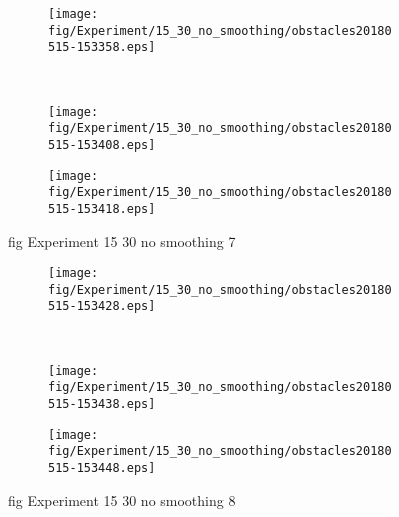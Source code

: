 \begin{figure}[H]
	\centering
	\begin{subfigure}[b]{0.45\textwidth}
		\texttt{[image: fig/Experiment/15\_30\_no\_smoothing/obstacles20180515-153358.eps]}
		\caption{}
		\label{fig:Experiment:15_30_no_smoothing:obstacles20180515-153358}
	\end{subfigure}
	~
	\begin{subfigure}[b]{0.45\textwidth}
		\texttt{[image: fig/Experiment/15\_30\_no\_smoothing/obstacles20180515-153408.eps]}
		\caption{}
		\label{fig:Experiment:15_30_no_smoothing:obstacles20180515-153408}
	\end{subfigure}

	\begin{subfigure}[b]{0.45\textwidth}
		\texttt{[image: fig/Experiment/15\_30\_no\_smoothing/obstacles20180515-153418.eps]}
		\caption{}
		\label{fig:Experiment:15_30_no_smoothing:obstacles20180515-153418}
	\end{subfigure}
	\caption{fig Experiment 15 30 no smoothing 7}
	\label{fig:Experiment:15_30_no_smoothing:7}
\end{figure}

\begin{figure}[H]
	\centering
	\begin{subfigure}[b]{0.45\textwidth}
		\texttt{[image: fig/Experiment/15\_30\_no\_smoothing/obstacles20180515-153428.eps]}
		\caption{}
		\label{fig:Experiment:15_30_no_smoothing:obstacles20180515-153428}
	\end{subfigure}
	~
	\begin{subfigure}[b]{0.45\textwidth}
		\texttt{[image: fig/Experiment/15\_30\_no\_smoothing/obstacles20180515-153438.eps]}
		\caption{}
		\label{fig:Experiment:15_30_no_smoothing:obstacles20180515-153438}
	\end{subfigure}

	\begin{subfigure}[b]{0.45\textwidth}
		\texttt{[image: fig/Experiment/15\_30\_no\_smoothing/obstacles20180515-153448.eps]}
		\caption{}
		\label{fig:Experiment:15_30_no_smoothing:obstacles20180515-153448}
	\end{subfigure}
	\caption{fig Experiment 15 30 no smoothing 8}
	\label{fig:Experiment:15_30_no_smoothing:8}
\end{figure}

